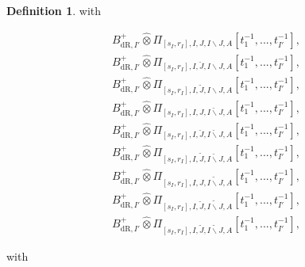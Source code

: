 \documentclass[12pt]{amsart}
\theoremstyle{definition}
\newtheorem{definition}[theorem]{Definition}
\numberwithin{equation}{section}
\begin{document}
\begin{definition}
with

\begin{align}
B^+_{\mathrm{dR},I'}	\widehat{\otimes}\Pi_{[s_I,r_I],I,J,I\backslash J,A}[t_1^{-1},...,t_{I'}^{-1}],\\	
B^+_{\mathrm{dR},I'}	\widehat{\otimes}\Pi_{[s_I,r_I],I,\breve{J},I\backslash J,A}[t_1^{-1},...,t_{I'}^{-1}],\\	
B^+_{\mathrm{dR},I'}	\widehat{\otimes}\Pi_{[s_I,r_I],I,\widetilde{J},I\backslash J,A}[t_1^{-1},...,t_{I'}^{-1}],\\
B^+_{\mathrm{dR},I'}	\widehat{\otimes}\Pi_{[s_I,r_I],I,J,\breve{I\backslash J},A}[t_1^{-1},...,t_{I'}^{-1}],\\	
B^+_{\mathrm{dR},I'}	\widehat{\otimes}\Pi_{[s_I,r_I],I,\breve{J},\breve{I\backslash J},A}[t_1^{-1},...,t_{I'}^{-1}],\\
B^+_{\mathrm{dR},I'}	\widehat{\otimes}\Pi_{[s_I,r_I],I,\widetilde{J},\breve{I\backslash J},A}[t_1^{-1},...,t_{I'}^{-1}],\\
B^+_{\mathrm{dR},I'}	\widehat{\otimes}\Pi_{[s_I,r_I],I,J,\widetilde{I\backslash J},A}[t_1^{-1},...,t_{I'}^{-1}],\\	
B^+_{\mathrm{dR},I'}	\widehat{\otimes}\Pi_{[s_I,r_I],I,\breve{J},\widetilde{I\backslash J},A}[t_1^{-1},...,t_{I'}^{-1}],\\
B^+_{\mathrm{dR},I'}	\widehat{\otimes}\Pi_{[s_I,r_I],I,\widetilde{J},\widetilde{I\backslash J},A}[t_1^{-1},...,t_{I'}^{-1}],
\end{align}

with 


\end{definition}
\end{document}
